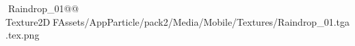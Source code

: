    Raindrop_01@   @          	   Texture2D   F   Assets/AppParticle/pack2/Media/Mobile/Textures/Raindrop_01.tga.tex.png